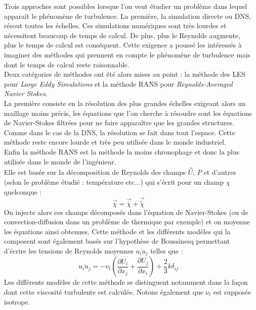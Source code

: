 \documentclass[a4paper,10pt]{article}
\newcommand{\lp}{\left(}
\newcommand{\rp}{\right)}
\begin{document}
Trois approches sont possibles lorsque l'on veut étudier un problème dans lequel apparaît le phénomène de turbulence. La première, la simulation directe ou DNS, résout toutes les échelles. Ces simulations numériques sont très lourdes et nécessitent beaucoup de temps de calcul. De plus, plus le Reynolds augmente, plus le temps de calcul est conséquent. Cette exigence a poussé les intéressés à imaginer des méthodes qui prennent en compte le phénomène de turbulence mais dont le temps de calcul reste raisonnable.\\
Deux catégories de méthodes ont été alors mises au point : la méthode des LES pour \textit{Large Eddy Simulations} et la méthode RANS pour \textit{Reynolds-Averaged Navier Stokes}.\\
La première consiste en la résolution des plus grandes échelles exigeant alors un maillage moins précis, les équations que l'on cherche à résoudre sont les équations de Navier-Stokes filtrées pour ne faire apparaître que les grandes structures. Comme dans le cas de la DNS, la résolution se fait dans tout l'espace. Cette méthode reste encore lourde et très peu utilisée dans le monde industriel.\\
Enfin la méthode RANS est la méthode la moins chronophage et donc la plus utilisée dans le monde de l'ingénieur.\\
Elle est basée sur la décomposition de Reynolds des champs $\vec{U} $, $P$ et d'autres (selon le problème étudié : température etc...) qui s'écrit pour un champ $\chi$ quelconque :
\begin{equation}
\vec{\chi} = \vec{\overline{\chi}} + \vec{\tilde{\chi}} 
\end{equation}
On injecte alors ces champs décomposés dans l'équation de Navier-Stokes (ou de convection-diffusion dans un problème de thermique par exemple) et on moyenne les équations ainsi obtenues. Cette méthode et les différents modèles qui la composent sont également basés sur l'hypothèse de Boussinesq permettant d'écrire les tensions de Reynolds moyennes $\overline{u_iu_j}$ telles que :
\begin{equation}
\overline{u_iu_j} = -\nu_t \lp \frac{\partial U_i}{\partial x_j} + \frac{\partial U_j}{\partial x_i} \rp + \frac{2}{3} k \delta_{ij}  \label{nut}
\end{equation}  
Les différents modèles de cette méthode se distinguent notamment dans la façon dont cette viscosité turbulente est calculée. Notons également que $\nu_t$ est supposée isotrope.
\end{document}
